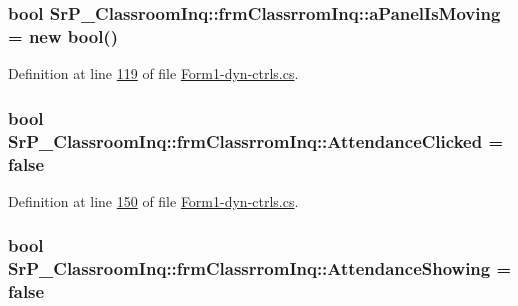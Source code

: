 \hypertarget{class_sr_p___classroom_inq_1_1frm_classrrom_inq_ac17e540d0c6f7127a478c861290c883c}{
\subsubsection[{a\-Panel\-Is\-Moving}]{\setlength{\rightskip}{0pt plus 5cm}bool {\bf \-Sr\-P\-\_\-\-Classroom\-Inq\-::frm\-Classrrom\-Inq\-::a\-Panel\-Is\-Moving} = new bool()}}
\label{class_sr_p___classroom_inq_1_1frm_classrrom_inq_ac17e540d0c6f7127a478c861290c883c}


\-Definition at line \hyperlink{_form1-dyn-ctrls_8cs_source_l00119}{119} of file \hyperlink{_form1-dyn-ctrls_8cs_source}{\-Form1-\/dyn-\/ctrls.\-cs}.

\hypertarget{class_sr_p___classroom_inq_1_1frm_classrrom_inq_a319172bf9b9e58ec37499658a5289284}{
\subsubsection[{\-Attendance\-Clicked}]{\setlength{\rightskip}{0pt plus 5cm}bool {\bf \-Sr\-P\-\_\-\-Classroom\-Inq\-::frm\-Classrrom\-Inq\-::\-Attendance\-Clicked} = false}}
\label{class_sr_p___classroom_inq_1_1frm_classrrom_inq_a319172bf9b9e58ec37499658a5289284}


\-Definition at line \hyperlink{_form1-dyn-ctrls_8cs_source_l00150}{150} of file \hyperlink{_form1-dyn-ctrls_8cs_source}{\-Form1-\/dyn-\/ctrls.\-cs}.

\hypertarget{class_sr_p___classroom_inq_1_1frm_classrrom_inq_a24415681575df1fd435d1b1da60dfde3}{
\subsubsection[{\-Attendance\-Showing}]{\setlength{\rightskip}{0pt plus 5cm}bool {\bf \-Sr\-P\-\_\-\-Classroom\-Inq\-::frm\-Classrrom\-Inq\-::\-Attendance\-Showing} = false}}
\label{class_sr_p___classroom_inq_1_1frm_classrrom_inq_a24415681575df1fd435d1b1da60dfde3}


